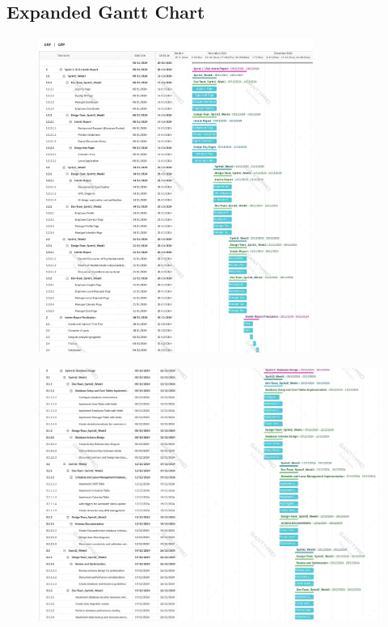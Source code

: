 \documentclass[a4paper,12pt, oneside]{report}
\begin{document}
{}



\begin{appendices}
\cleardoublepage
\chapter{Expanded Gantt Chart}
\label{sec:expanded-gantt-chart}
\begin{figure}[H]
    \includegraphics[width=0.8\textwidth]{GanttCharts/GRP_GanttGraph_Expanded_P1.png}
\end{figure}
\begin{figure}[H]
    \centering
    \includegraphics[width=\textwidth]{GanttCharts/GRP_GanttGraph_Expanded_P2.png}

\end{figure}
\end{appendices}
\end{document}

